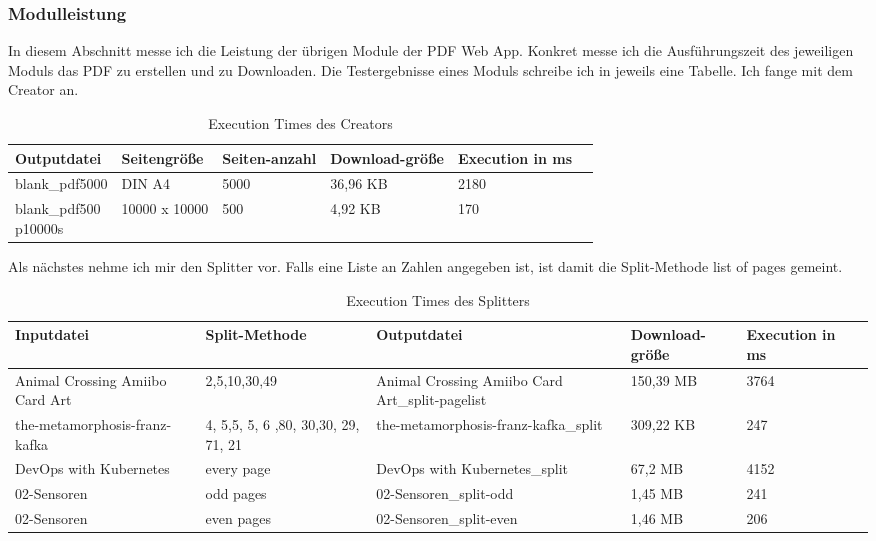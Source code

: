 \subsubsection{Modulleistung}
In diesem Abschnitt messe ich die Leistung der übrigen Module der PDF Web App. Konkret messe ich die Ausführungszeit des jeweiligen Moduls das PDF zu erstellen und zu Downloaden. Die Testergebnisse eines Moduls schreibe ich in jeweils eine Tabelle. Ich fange mit dem Creator an.

\begin{table}[!htbp]
	\centering
	\begin{tabular}{|p{3cm}|p{3cm}|p{2cm}|p{2cm}|p{2cm}|p{2cm}|}
		\hline
		\textbf{Outputdatei}					& \textbf{Seitengröße}	& \textbf{Seiten-anzahl}	& \textbf{Download-größe}	& \textbf{Execution in ms} 	\\ 
		\hline
		blank\_pdf5000							& DIN A4 				& 5000 						& 36,96 KB 					& 2180  					\\
		\parbox[t]{4cm}{blank\_pdf500\\p10000s}	& 10000 x 10000			& 500 						& 4,92 KB					& 170 						\\
		\hline
	\end{tabular}
	\caption{Execution Times des Creators}
	\label{table:creator-dur}
\end{table}

Als nächstes nehme ich mir den Splitter vor. Falls eine Liste an Zahlen angegeben ist, ist damit die Split-Methode list of pages gemeint.

\begin{table}[!htbp]
	\centering
	\begin{tabular}{|p{2.5cm}|p{3cm}|p{3cm}|p{2cm}|p{2cm}|p{2cm}|}
		\hline
		\textbf{Inputdatei}					& \textbf{Split-Methode}					& \textbf{Outputdatei}								& \textbf{Download-größe}	& \textbf{Execution in ms} 	\\ 
		\hline
		Animal Crossing Amiibo Card Art		& 2,5,10,30,49 								& Animal Crossing Amiibo Card Art\_split-pagelist 	& 150,39 MB					& 3764  					\\
		the-metamorphosis-franz-kafka		& 4, 5,5, 5, 6 ,80, 30,30, 29, 71, 21 		& the-metamorphosis-franz-kafka\_split 				& 309,22 KB					& 247  						\\
		DevOps with Kubernetes				& every page								& DevOps with Kubernetes\_split 					& 67,2 MB					& 4152 						\\
		02-Sensoren							& odd pages 								& 02-Sensoren\_split-odd 							& 1,45 MB					& 241  						\\
		02-Sensoren							& even pages								& 02-Sensoren\_split-even 							& 1,46 MB					& 206 						\\
		\hline
	\end{tabular}
	\caption{Execution Times des Splitters}
	\label{table:splitter-dur}
\end{table}

